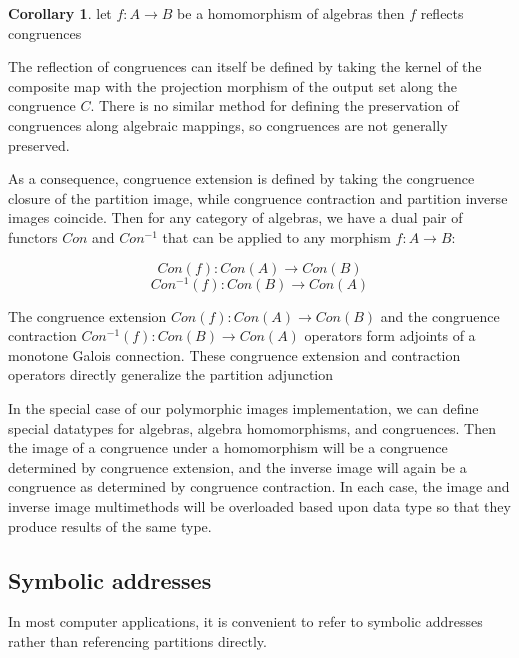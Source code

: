 \documentclass[a4paper,11pt, notitlepage]{report}
\theoremstyle{definition}
\newtheorem{corollary}{Corollary}[section]
\begin{document}
\begin{corollary}
 let $f: A \to B$ be a homomorphism of algebras then $f$ reflects congruences
\end{corollary}

The reflection of congruences can itself be defined by taking the kernel of the composite map with the projection morphism of the output set along the congruence $C$. There is no similar method for defining the preservation of congruences along algebraic mappings, so congruences are not generally preserved.

As a consequence, congruence extension is defined by taking the congruence closure of the partition image, while congruence contraction and partition inverse images coincide. Then for any category of algebras, we have a dual pair of functors $Con$ and $Con^{-1}$ that can be applied to any morphism $f: A \to B$:

\[ Con(f) : Con(A) \to Con(B) \]
\[ Con^{-1}(f) : Con(B) \to Con(A) \]

The congruence extension $Con(f): Con(A) \to Con(B)$ and the congruence contraction $Con^{-1}(f): Con(B) \to Con(A)$ operators form adjoints of a monotone Galois connection. These congruence extension and contraction operators directly generalize the partition adjunction

In the special case of our polymorphic images implementation, we can define special datatypes for algebras, algebra homomorphisms, and congruences. Then the image of a congruence under a homomorphism will be a congruence determined by congruence extension, and the inverse image will again be a congruence as determined by congruence contraction. In each case, the image and inverse image multimethods will be overloaded based upon data type so that they produce results of the same type.

\newpage

\subsection{Symbolic addresses}
In most computer applications, it is convenient to refer to symbolic addresses rather than referencing partitions directly.
\end{document}
